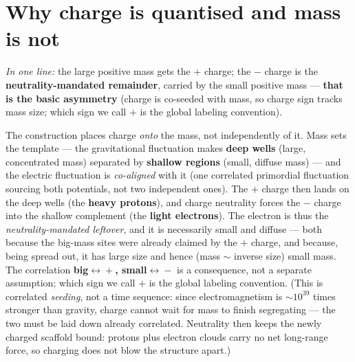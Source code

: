 \documentclass[11pt]{article}
\begin{document}
\section{Why charge is quantised and mass is not}\label{sec:quantization}
\emph{In one line:} the large positive mass gets the $+$ charge; the $-$ charge is the
\textbf{neutrality-mandated remainder}, carried by the small positive mass --- \textbf{that is the basic
asymmetry} (charge is co-seeded with mass, so charge sign tracks mass size; which sign we call $+$ is the
global labeling convention).

The construction places charge \emph{onto} the mass, not independently of it. Mass sets the template ---
the gravitational fluctuation makes \textbf{deep wells} (large, concentrated mass) separated by
\textbf{shallow regions} (small, diffuse mass) --- and the electric fluctuation is \emph{co-aligned} with
it (one correlated primordial fluctuation sourcing both potentials, not two independent ones). The $+$
charge then lands on the deep wells (the \textbf{heavy protons}), and charge neutrality forces the $-$
charge into the shallow complement (the \textbf{light electrons}). The electron is thus the
\emph{neutrality-mandated leftover}, and it is necessarily small and diffuse --- both because the
big-mass sites were already claimed by the $+$ charge, and because, being spread out, it has large size
and hence (mass $\sim$ inverse size) small mass. The correlation \textbf{big${}\leftrightarrow{}+$,
small${}\leftrightarrow{}-$} is a consequence, not a separate assumption; which sign we call $+$ is the
global labeling convention. (This is correlated \emph{seeding}, not a time sequence: since
electromagnetism is ${\sim}10^{39}$ times stronger than gravity, charge cannot wait for mass to finish
segregating --- the two must be laid down already correlated. Neutrality then keeps the newly charged
scaffold bound: protons plus electron clouds carry no net long-range force, so charging does not blow the
structure apart.)
\end{document}

